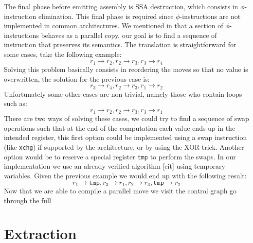 The final phase before emitting assembly is SSA destruction, which consists in $\phi$-instruction elimination. This final phase is required since $\phi$-instructions are not implemented in common architectures.
We mentioned in  that a section of $\phi$-instructions behaves as a parallel copy, our goal is to find a sequence of instruction that preserves its semantics. The translation is straightforward for some cases, take the following example:
\[
  r_1 \to r_2, r_2 \to r_3, r_3 \to r_4
\]
Solving this problem basically consists in reordering the moves so that no value is overwritten, the solution for the previous case is:
\[
  r_3 \to r_4, r_2 \to r_3, r_1 \to r_2
\]
Unfortunately some other cases are non-trivial, namely those who contain loops such as:
\[
  r_1 \to r_2, r_2 \to r_3, r_3 \to r_1
\]
There are two ways of solving these cases, we could try to find a sequence of swap operations such that at the end of the computation each value ends up in the intended register, this first option could be implemented using a swap instruction (like \texttt{xchg}) if supported by the architecture, or by using the XOR trick. Another option would be to reserve a special register \texttt{tmp} to perform the swaps. In our implementation we use an already verified algorithm [cit] using temporary variables. Given the previous example we would end up with the following result:
\[
  r_1 \to \texttt{tmp}, r_3 \to r_1, r_2 \to r_3, \texttt{tmp} \to r_2
\]
Now that we are able to compile a parallel move we visit the control graph go through the full 


\section{Extraction}
\label{sec:extract}